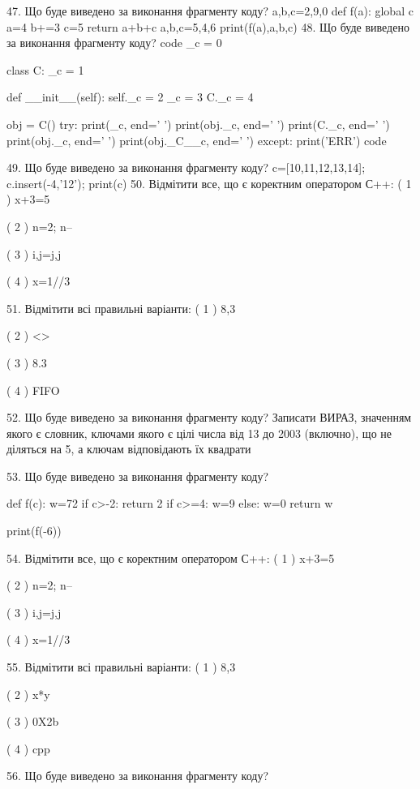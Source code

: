 \documentclass[11pt]{article}
\begin{document}
47. Що буде виведено за виконання фрагменту коду?
a,b,c=2,9,0
    def f(a):
      global c      a=4
      b+=3
      c=5
      return a+b+c
    a,b,c=5,4,6
    print(f(a),a,b,c)
48. Що буде виведено за виконання фрагменту коду?
code
_c = 0

class C:
    _c = 1
    
    def __init__(self):
        self._c = 2
        _c = 3
        C._c = 4

obj = C()
try:
    print(_c, end=' ')
    print(obj._c, end=' ')
    print(C._c, end=' ')
    print(obj._c, end=' ')
    print(obj._C__c, end=' ')
except:
    print('ERR')
code

49. Що буде виведено за виконання фрагменту коду?
c=[10,11,12,13,14]; c.insert(-4,'12'); print(c)
50. Відмітити все, що є коректним оператором С++:
( 1 ) x+3=5

( 2 ) n=2; n--

( 3 ) i,j=j,j

( 4 ) x=1//3

51. Відмітити всі правильні варіанти:
( 1 ) 8,3

( 2 ) <>

( 3 ) 8.3

( 4 ) FIFO

52. Що буде виведено за виконання фрагменту коду?
Записати ВИРАЗ, значенням якого є словник, ключами якого є цілі числа від 13 до 2003 (включно), що не діляться на 5, а ключам відповідають їх квадрати 

53. Що буде виведено за виконання фрагменту коду?

def f(c):
    w=72
    if c>-2: 
        return 2
    if c>=4:
         w=9
    else:
         w=0
    return w

print(f(-6))

54. Відмітити все, що є коректним оператором С++:
( 1 ) x+3=5

( 2 ) n=2; n--

( 3 ) i,j=j,j

( 4 ) x=1//3

55. Відмітити всі правильні варіанти:
( 1 ) 8,3

( 2 ) x*y

( 3 ) 0X2b

( 4 ) cpp

56. Що буде виведено за виконання фрагменту коду?
\end{document}
